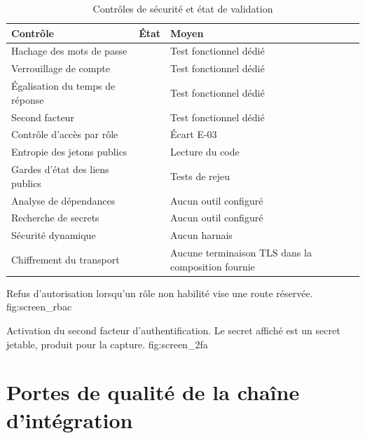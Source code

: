 \begin{table}[htbp]
  \centering
  \caption{Contrôles de sécurité et état de validation}
  \label{tab:security_validation}
  \begin{tabularx}{\textwidth}{L{3.8cm} L{3.2cm} X}
    \toprule
    \textbf{Contrôle} & \textbf{État} & \textbf{Moyen} \\
    \midrule
    Hachage des mots de passe      &  & Test fonctionnel dédié \\
    Verrouillage de compte         &  & Test fonctionnel dédié \\
    Égalisation du temps de réponse&  & Test fonctionnel dédié \\
    Second facteur                 &  & Test fonctionnel dédié \\
    Contrôle d'accès par rôle      &      & Écart E-03 \\
    Entropie des jetons publics    &  & Lecture du code \\
    Gardes d'état des liens publics&  & Tests de rejeu \\
    Analyse de dépendances         &         & Aucun outil configuré \\
    Recherche de secrets           &         & Aucun outil configuré \\
    Sécurité dynamique             &           & Aucun harnais \\
    Chiffrement du transport       &             & Aucune terminaison TLS dans la composition fournie \\
    \bottomrule
  \end{tabularx}
\end{table}

  {Refus d'autorisation lorsqu'un rôle non habilité vise une route réservée.}
  {fig:screen_rbac}

  {Activation du second facteur d'authentification. Le secret affiché est un
   secret jetable, produit pour la capture.}
  {fig:screen_2fa}

\section{Portes de qualité de la chaîne d'intégration}
\label{sec:ci_gates}

